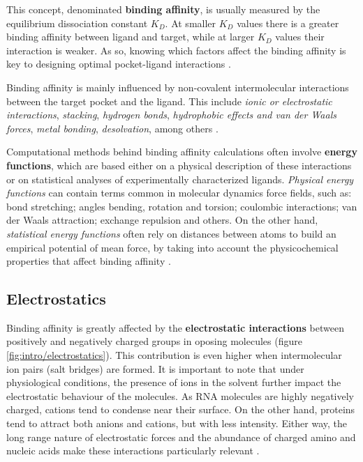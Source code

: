     This concept, denominated \textbf{binding affinity}, is usually measured by the equilibrium dissociation constant $K_D$. At smaller $K_D$ values there is a greater binding affinity between ligand and target, while at larger $K_D$ values their interaction is weaker. As so, knowing which factors affect the binding affinity is key to designing optimal pocket-ligand interactions \cite{binding_affinity_web}.

    Binding affinity is mainly influenced by non-covalent intermolecular interactions between the target pocket and the ligand. This include \textit{ionic or electrostatic interactions}, \textit{stacking}, \textit{hydrogen bonds}, \textit{hydrophobic effects and van der Waals forces}, \textit{metal bonding}, \textit{desolvation}, among others \cite{binding_affinity_2016, binding_affinity_web, electrostatics_2020, stacking_binding_2020, stacking_trp_2022, hbonds_2023, hydrophobic_2017, hydrophobic_2022}.

    Computational methods behind binding affinity calculations often involve \textbf{energy functions}, which are based either on a physical description of these interactions or on statistical analyses of experimentally characterized ligands. \textit{Physical energy functions} can contain terms common in molecular dynamics force fields, such as: bond stretching; angles bending, rotation and torsion; coulombic interactions; van der Waals attraction; exchange repulsion and others. On the other hand, \textit{statistical energy functions} often rely on distances between atoms to build an empirical potential of mean force, by taking into account the physicochemical properties that affect binding affinity \cite{binding_affinity_2016}.

  \subsection{Electrostatics}
    Binding affinity is greatly affected by the \textbf{electrostatic interactions} between positively and negatively charged groups in oposing molecules (figure \ref{fig:intro/electrostatics}). This contribution is even higher when intermolecular ion pairs (salt bridges) are formed. It is important to note that under physiological conditions, the presence of ions in the solvent further impact the electrostatic behaviour of the molecules. As RNA molecules are highly negatively charged, cations tend to condense near their surface. On the other hand, proteins tend to attract both anions and cations, but with less intensity. Either way, the long range nature of electrostatic forces and the abundance of charged amino and nucleic acids make these interactions particularly relevant \cite{electrostatics_2020, electrostatics_2019, apbs_2004}.

